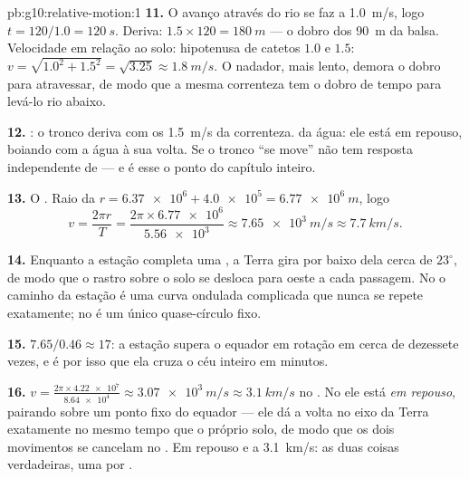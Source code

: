 \begin{solution}{pb:g10:relative-motion:1}
\textbf{11.} O avanço através do rio se faz a \qty{1.0}{m/s}, logo
$t = 120/1.0 = \qty{120}{s}$. Deriva:
$1.5 \times 120 = \qty{180}{m}$ --- o dobro dos \qty{90}{m} da balsa.
Velocidade em relação ao solo: hipotenusa de catetos $1.0$ e $1.5$:
$v = \sqrt{1.0^2 + 1.5^2} = \sqrt{3.25} \approx \qty{1.8}{m/s}$. O
nadador, mais lento, demora o dobro para atravessar, de modo que a mesma
correnteza tem o dobro de tempo para levá-lo rio abaixo.

\textbf{12.} : o tronco deriva com os \qty{1.5}{m/s}
da correnteza.  da água: ele está em repouso, boiando com a
água à sua volta. Se o tronco ``se move'' não tem resposta independente
de  --- e é esse o ponto do capítulo inteiro.

\textbf{13.} O . Raio da 
$r = \num{6.37e6} + \num{4.0e5} = \qty{6.77e6}{m}$, logo
\[
v = \frac{2\pi r}{T} = \frac{2\pi \times \num{6.77e6}}{\num{5.56e3}}
\approx \qty{7.65e3}{m/s} \approx \qty{7.7}{km/s}.
\]

\textbf{14.} Enquanto a estação completa uma , a Terra gira por
baixo dela cerca de $23^\circ$, de modo que o rastro sobre o solo se
desloca para oeste a cada passagem. No  o caminho da
estação é uma curva ondulada complicada que nunca se repete exatamente;
no  é um único quase-círculo fixo.

\textbf{15.} $7.65 / 0.46 \approx 17$: a estação supera o equador em
rotação em cerca de dezessete vezes, e é por isso que ela cruza o céu
inteiro em minutos.

\textbf{16.} $v = \frac{2\pi \times \num{4.22e7}}{\num{8.64e4}}
\approx \qty{3.07e3}{m/s} \approx \qty{3.1}{km/s}$ no . No  ele está \emph{em repouso}, pairando
sobre um ponto fixo do equador --- ele dá a volta no eixo da Terra
exatamente no mesmo tempo que o próprio solo, de modo que os dois
movimentos se cancelam no . Em repouso e a
\qty{3.1}{km/s}: as duas coisas verdadeiras, uma por .


\end{solution}
